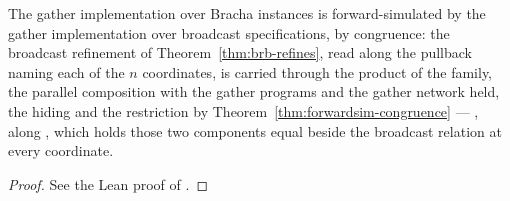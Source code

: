 \begin{theorem}
  \label{thm:gather-broadcast-substitution}
  \leanok
  The gather implementation over Bracha instances is forward-simulated by the gather implementation over broadcast specifications, by congruence: the broadcast refinement of Theorem~\ref{thm:brb-refines}, read along the pullback naming each of the $n$ coordinates, is carried through the product of the family, the parallel composition with the gather programs and the gather network held, the hiding and the restriction by Theorem~\ref{thm:forwardsim-congruence} --- , along , which holds those two components equal beside the broadcast relation at every coordinate.
\end{theorem}

\begin{proof}\leanok
  See the Lean proof of .
\end{proof}
